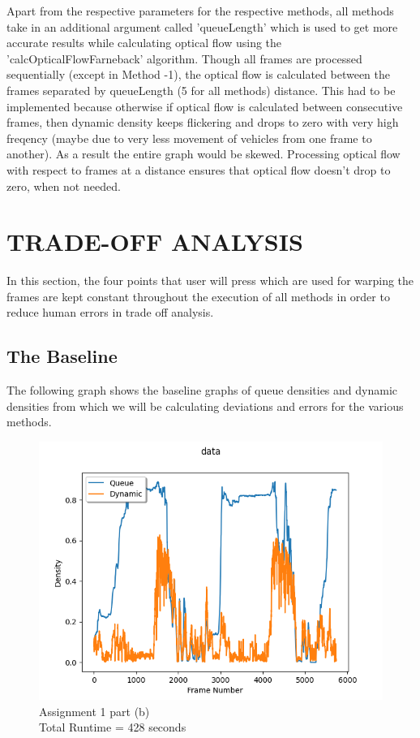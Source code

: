 \documentclass[paper=a4, fontsize = 12pt]{scrartcl}
\numberwithin{equation}{section}		%
\numberwithin{figure}{section}			%
\numberwithin{table}{section}				%
\begin{document}
Apart from the respective parameters for the respective methods, all methods take in an additional argument called 'queueLength' which is used to get more accurate results while calculating optical flow using the 'calcOpticalFlowFarneback' algorithm. Though all frames are processed sequentially (except in Method -1), the optical flow is calculated between the frames separated by queueLength (5 for all methods) distance. This had to be implemented because otherwise if optical flow is calculated between consecutive frames, then dynamic density keeps flickering and drops to zero with very high freqency (maybe due to very less movement of vehicles from one frame to another). As a result the entire graph would be skewed. Processing optical flow with respect to frames at a distance ensures that optical flow doesn't drop to zero, when not needed.








\section{TRADE-OFF ANALYSIS}

In this section, the four points that user will press which are used for warping the frames are kept constant throughout the execution of all methods in order to reduce human errors in trade off analysis.
\subsection{The Baseline}
The following graph shows the baseline graphs of queue densities and dynamic densities from which we will be calculating deviations and errors for the various methods. \\

\begin{figure}[ht!]
    \centering
    \captionsetup{justification=centering,margin=2cm}
    \includegraphics[width=15cm]{data.png}
    \caption{ Assignment 1 part (b)\\Total Runtime = 428 seconds}
    \label{fig:baseline}
\end{figure}
\end{document}
